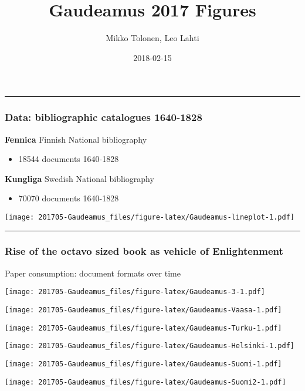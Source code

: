 \documentclass[13pt,]{article}
\title{Gaudeamus 2017 Figures}
\author{Mikko Tolonen, Leo Lahti}
\date{2018-02-15}
\providecommand{\tightlist}{%
  \setlength{\itemsep}{0pt}\setlength{\parskip}{0pt}}
\begin{document}
\maketitle

\begin{center}\rule{0.5\linewidth}{\linethickness}\end{center}

\subsubsection{Data: bibliographic catalogues
1640-1828}\label{data-bibliographic-catalogues-1640-1828}

\textbf{Fennica} Finnish National bibliography

\begin{itemize}
\tightlist
\item
  18544 documents 1640-1828
\end{itemize}

\textbf{Kungliga} Swedish National bibliography

\begin{itemize}
\tightlist
\item
  70070 documents 1640-1828
\end{itemize}

\texttt{[image: 201705-Gaudeamus\_files/figure-latex/Gaudeamus-lineplot-1.pdf]}

\begin{center}\rule{0.5\linewidth}{\linethickness}\end{center}

\subsubsection{Rise of the octavo sized book as vehicle of
Enlightenment}\label{rise-of-the-octavo-sized-book-as-vehicle-of-enlightenment}

Paper consumption: document formats over time

\texttt{[image: 201705-Gaudeamus\_files/figure-latex/Gaudeamus-3-1.pdf]}

\texttt{[image: 201705-Gaudeamus\_files/figure-latex/Gaudeamus-Vaasa-1.pdf]}

\texttt{[image: 201705-Gaudeamus\_files/figure-latex/Gaudeamus-Turku-1.pdf]}

\texttt{[image: 201705-Gaudeamus\_files/figure-latex/Gaudeamus-Helsinki-1.pdf]}

\texttt{[image: 201705-Gaudeamus\_files/figure-latex/Gaudeamus-Suomi-1.pdf]}

\texttt{[image: 201705-Gaudeamus\_files/figure-latex/Gaudeamus-Suomi2-1.pdf]}
\end{document}
